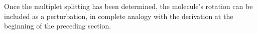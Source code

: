 Once the multiplet splitting has been determined, the molecule's rotation can be included as a perturbation, in complete analogy with the derivation at the beginning of the preceding section.
